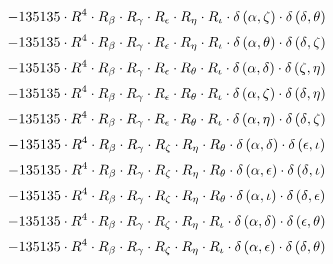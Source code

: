 \begin{subequations}
\begin{gather}
 \\[0.2em] \notag 		 - 135135 \cdot R^{4} \cdot R_{\beta{}} \cdot R_{\gamma{}} \cdot R_{\epsilon{}} \cdot R_{\eta{}} \cdot R_{\iota{}} \cdot \delta{}\left(\alpha{}, \zeta{}\right) \cdot \delta{}\left(\delta{}, \theta{}\right) 
 \\[0.2em] \notag 		 - 135135 \cdot R^{4} \cdot R_{\beta{}} \cdot R_{\gamma{}} \cdot R_{\epsilon{}} \cdot R_{\eta{}} \cdot R_{\iota{}} \cdot \delta{}\left(\alpha{}, \theta{}\right) \cdot \delta{}\left(\delta{}, \zeta{}\right) 
 \\[0.2em] \notag 		 - 135135 \cdot R^{4} \cdot R_{\beta{}} \cdot R_{\gamma{}} \cdot R_{\epsilon{}} \cdot R_{\theta{}} \cdot R_{\iota{}} \cdot \delta{}\left(\alpha{}, \delta{}\right) \cdot \delta{}\left(\zeta{}, \eta{}\right) 
 \\[0.2em] \notag 		 - 135135 \cdot R^{4} \cdot R_{\beta{}} \cdot R_{\gamma{}} \cdot R_{\epsilon{}} \cdot R_{\theta{}} \cdot R_{\iota{}} \cdot \delta{}\left(\alpha{}, \zeta{}\right) \cdot \delta{}\left(\delta{}, \eta{}\right) 
 \\[0.2em] \notag 		 - 135135 \cdot R^{4} \cdot R_{\beta{}} \cdot R_{\gamma{}} \cdot R_{\epsilon{}} \cdot R_{\theta{}} \cdot R_{\iota{}} \cdot \delta{}\left(\alpha{}, \eta{}\right) \cdot \delta{}\left(\delta{}, \zeta{}\right) 
 \\[0.2em] \notag 		 - 135135 \cdot R^{4} \cdot R_{\beta{}} \cdot R_{\gamma{}} \cdot R_{\zeta{}} \cdot R_{\eta{}} \cdot R_{\theta{}} \cdot \delta{}\left(\alpha{}, \delta{}\right) \cdot \delta{}\left(\epsilon{}, \iota{}\right) 
 \\[0.2em] \notag 		 - 135135 \cdot R^{4} \cdot R_{\beta{}} \cdot R_{\gamma{}} \cdot R_{\zeta{}} \cdot R_{\eta{}} \cdot R_{\theta{}} \cdot \delta{}\left(\alpha{}, \epsilon{}\right) \cdot \delta{}\left(\delta{}, \iota{}\right) 
 \\[0.2em] \notag 		 - 135135 \cdot R^{4} \cdot R_{\beta{}} \cdot R_{\gamma{}} \cdot R_{\zeta{}} \cdot R_{\eta{}} \cdot R_{\theta{}} \cdot \delta{}\left(\alpha{}, \iota{}\right) \cdot \delta{}\left(\delta{}, \epsilon{}\right) 
 \\[0.2em] \notag 		 - 135135 \cdot R^{4} \cdot R_{\beta{}} \cdot R_{\gamma{}} \cdot R_{\zeta{}} \cdot R_{\eta{}} \cdot R_{\iota{}} \cdot \delta{}\left(\alpha{}, \delta{}\right) \cdot \delta{}\left(\epsilon{}, \theta{}\right) 
 \\[0.2em] \notag 		 - 135135 \cdot R^{4} \cdot R_{\beta{}} \cdot R_{\gamma{}} \cdot R_{\zeta{}} \cdot R_{\eta{}} \cdot R_{\iota{}} \cdot \delta{}\left(\alpha{}, \epsilon{}\right) \cdot \delta{}\left(\delta{}, \theta{}\right) 

\end{gather}
\end{subequations}
